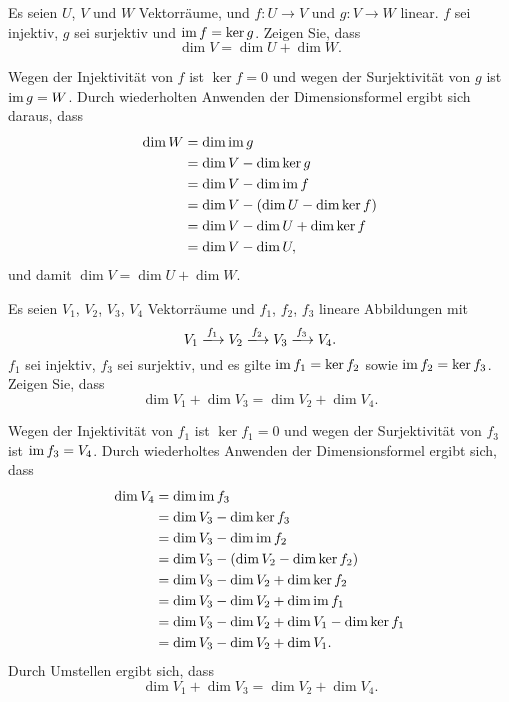\begin{question}
 Es seien $U$, $V$ und $W$ Vektorräume, und $f \colon U \to V$ und $g \colon V \to W$ linear. $f$ sei injektiv, $g$ sei surjektiv und $\operatorname{im} f = \ker g$. Zeigen Sie, dass
 \[
  \dim V = \dim U + \dim W.
 \]
\end{question}
\begin{solution}
 Wegen der Injektivität von $f$ ist $\ker f = 0$ und wegen der Surjektivität von $g$ ist $\operatorname{im} g = W$. Durch wiederholten Anwenden der Dimensionsformel ergibt sich daraus, dass
 \begin{align*}
  \dim W
  &= \dim \operatorname{im} g \\
  &= \dim V - \dim \ker g \\
  &= \dim V - \dim \operatorname{im} f \\
  &= \dim V - (\dim U - \dim \ker f) \\
  &= \dim V - \dim U + \dim \ker f \\
  &= \dim V - \dim U,
 \end{align*}
 und damit $\dim V = \dim U + \dim W$.
\end{solution}


\begin{question}
 Es seien $V_1$, $V_2$, $V_3$, $V_4$ Vektorräume und $f_1$, $f_2$, $f_3$ lineare Abbildungen mit
 \[
  V_1 \xlongrightarrow{f_1} V_2 \xlongrightarrow{f_2} V_3 \xlongrightarrow{f_3} V_4.
 \]
 $f_1$ sei injektiv, $f_3$ sei surjektiv, und es gilte $\operatorname{im} f_1 = \ker f_2$ sowie $\operatorname{im} f_2 = \ker f_3$. Zeigen Sie, dass
 \[
  \dim V_1 + \dim V_3 = \dim V_2 + \dim V_4.
 \]
\end{question}
\begin{solution}
 Wegen der Injektivität von $f_1$ ist $\ker f_1 = 0$ und wegen der Surjektivität von $f_3$ ist $\operatorname{im} f_3 = V_4$. Durch wiederholtes Anwenden der Dimensionsformel ergibt sich, dass
 \begin{align*}
  \dim V_4
  &= \dim \operatorname{im} f_3 \\
  &= \dim V_3 - \dim \ker f_3 \\
  &= \dim V_3 - \dim \operatorname{im} f_2 \\
  &= \dim V_3 - (\dim V_2 - \dim \ker f_2) \\
  &= \dim V_3 - \dim V_2 + \dim \ker f_2 \\
  &= \dim V_3 - \dim V_2 + \dim \operatorname{im} f_1 \\
  &= \dim V_3 - \dim V_2 + \dim V_1 - \dim \ker f_1 \\
  &= \dim V_3 - \dim V_2 + \dim V_1.
 \end{align*}
 Durch Umstellen ergibt sich, dass
 \[
  \dim V_1 + \dim V_3 = \dim V_2 + \dim V_4.
 \]
\end{solution}













